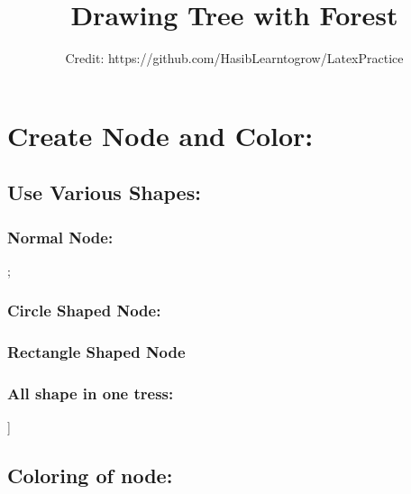 \documentclass{article}
\title{Drawing Tree with Forest}
\author{Credit: https://github.com/HasibLearntogrow/LatexPractice}
\begin{document}
	\maketitle
	\tableofcontents
	\clearpage
	
	\section{Create Node and Color:}
		\subsection{Use Various Shapes:}
		\subsubsection{Normal Node:}
		\begin{forest}
			[A];
		\end{forest}
		
		\subsubsection{Circle Shaped Node:}
		\begin{forest}
		\end{forest}
		
		\subsubsection{Rectangle Shaped Node}
		\begin{forest}
		\end{forest}	
		
		\subsubsection{All shape in one tress:}
		\begin{forest}
			[A,rectangle,draw[B,rectangle,draw][C]]
		\end{forest}
		
		\subsection{Coloring of node:}
		\begin{forest}
			[A,circle,draw,color=black,red,fill=red!20]
		\end{forest}
		
\end{document}

